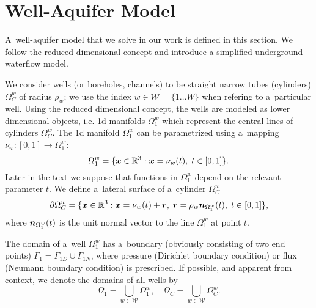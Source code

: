 \newpage
\section{Well-Aquifer Model}
A~well-aquifer model that we solve in our work is defined in this section.
We follow the reduced dimensional concept and introduce a simplified underground waterflow model.

We consider wells (or boreholes, channels) to be straight narrow tubes (cylinders) $\Omega^w_C$ of radius $\rho_w$;
we use the index $w\in\mathcal{W}=\{1\ldots W\}$ when refering to a~particular well.
Using the reduced dimensional concept, the wells are modeled as lower dimensional objects,
i.e. 1d manifolds $\Omega^w_1$ which represent the central lines of cylinders $\Omega^w_C$.
The 1d manifold $\Omega^w_1$ can be parametrized using a~mapping $\nu_w: [0,1] \rightarrow \Omega^w_1$:
\begin{equation} \label{eqn:1d_parametrization}
    \Omega^w_1 = \{\vc x\in\R^3: \vc x = \nu_w(t),\; t\in[0,1] \}. %
\end{equation}
Later in the text we suppose that functions in $\Omega^w_1$ depend on the relevant parameter $t$.
We define a~lateral surface of a~cylinder $\Omega^w_C$
\begin{equation}
    \partial\Omega^w_C = \{\mathbf{\boldsymbol{x}}\in\mathbb{R}^3: \mathbf{\boldsymbol{x}} = \nu_w(t) + \mathbf{\boldsymbol{r}},\; \mathbf{\boldsymbol{r}}=\rho_w\mathbf{\boldsymbol{n}}_{\Omega^w_1}(t),\; t\in[0,1] \},
\end{equation}
where $\mathbf{\boldsymbol{n}}_{\Omega^w_1}(t)$ is the unit normal vector to the line $\Omega^w_1$ at point $t$.

The domain of a~well $\Omega^w_1$ has a~boundary (obviously consisting of two end points)
$\Gamma_1 = \Gamma_{1D} \cup \Gamma_{1N}$, where pressure (Dirichlet boundary condition)
or flux (Neumann boundary condition) is prescribed.
If possible, and apparent from context, we denote the domains of all wells by
\begin{equation}
    \Omega_1 = \bigcup_{w\in\mathcal{W}} \Omega^w_1, \quad \Omega_C = \bigcup_{w\in\mathcal{W}} \Omega^w_C.
\end{equation}

